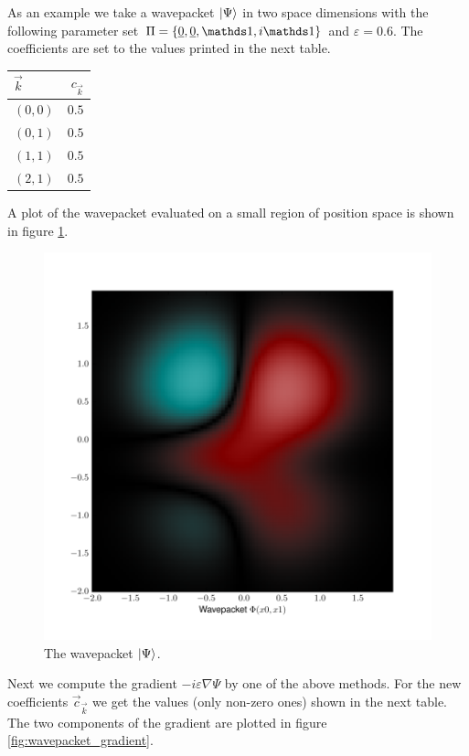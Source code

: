 As an example we take a wavepacket $\Ket{\Psi}$ in two space dimensions with the
following parameter set $\Pi = \{\vec{0}, \vec{0}, \id, i \id \}$ and $\varepsilon = 0.6$.
The coefficients are set to the values printed in the next table.

\begin{center}
\begin{tabular}{l r}
$\vec{k}$ & $c_{\vec{k}}$ \\
\hline
$(0,0)$ & $0.5$ \\
$(0,1)$ & $0.5$ \\
$(1,1)$ & $0.5$ \\
$(2,1)$ & $0.5$
\end{tabular}
\end{center}

A plot of the wavepacket evaluated on a small region of position space is shown
in figure \ref{fig:wavepacket_original}.

\begin{figure}
  \centering
  \includegraphics[scale=0.3]{./fig/wavepacket_original.pdf}
  \caption[Wavepacket of the gradient example]{The wavepacket $\Ket{\Psi}$.}
  \label{fig:wavepacket_original}
\end{figure}

Next we compute the gradient $-i \varepsilon \nabla \Psi$ by one of the above
methods. For the new coefficients $\vec{c}_{\vec{k}}$ we get the values (only
non-zero ones) shown in the next table. The two components of the gradient
are plotted in figure \ref{fig:wavepacket_gradient}.

